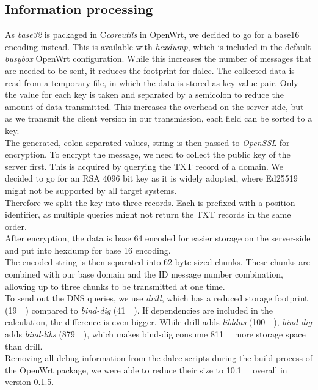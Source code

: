 \subsection{Information processing}
    As \textit{base32} is packaged in C\textit{coreutils} in OpenWrt, we decided to go for a base16 encoding instead. This is available with \textit{hexdump}, which is included in the default \textit{busybox} OpenWrt configuration. While this increases the number of messages that are needed to be sent, it reduces the footprint for dalec. The collected data is read from a temporary file, in which the data is stored as key-value pair. Only the value for each key is taken and separated by a semicolon to reduce the amount of data transmitted. This increases the overhead on the server-side, but as we transmit the client version in our transmission, each field can be sorted to a key.\\
    The generated, colon-separated values, string is then passed to \textit{OpenSSL} for encryption. To encrypt the message, we need to collect the public key of the server first.
    This is acquired by querying the TXT record of a domain. We decided to go for an RSA 4096 bit key as it is widely adopted, where Ed25519 might not be supported by all target systems.\\
    Therefore we split the key into three records. Each is prefixed with a position identifier, as multiple queries might not return the TXT records in the same order.\\
    After encryption, the data is base 64 encoded for easier storage on the server-side and put into hexdump for base 16 encoding.\\
    The encoded string is then separated into 62 byte-sized chunks. These chunks are combined with our base domain and the ID message number combination, allowing up to three chunks to be transmitted at one time.\\
    To send out the DNS queries, we use \textit{drill}, which has a reduced storage footprint (\SIlist{19}{\kilo\byte}) compared to \textit{bind-dig} (\SIlist{41}{\kilo\byte}). If dependencies are included in the calculation, the difference is even bigger. While drill adds \textit{libldns} (\SIlist{100}{\kilo\byte}), \textit{bind-dig}
    adds \textit{bind-libs} (\SIlist{879}{\kilo\byte}), which makes bind-dig consume \SIlist{811}{\kilo\byte} more storage space than drill.\\
    Removing all debug information from the dalec scripts during the build process of the OpenWrt package, we were able to reduce their size to \SIlist{10.1}{\kilo\byte} overall in version 0.1.5.
    
